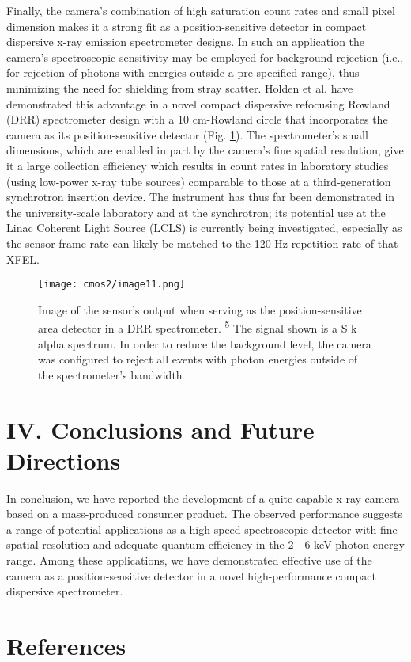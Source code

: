 Finally, the camera's combination of high saturation count rates and
small pixel dimension makes it a strong fit as a position-sensitive
detector in compact dispersive x-ray emission spectrometer designs. In
such an application the camera's spectroscopic sensitivity may be
employed for background rejection (i.e., for rejection of photons with
energies outside a pre-specified range), thus minimizing the need for
shielding from stray scatter. Holden et al. have demonstrated this
advantage in a novel compact dispersive refocusing Rowland (DRR)
spectrometer design with a 10 cm-Rowland circle that incorporates the
camera as its position-sensitive detector (Fig. \ref{cmos2_image11}). The spectrometer's
small dimensions, which are enabled in part by the camera's fine spatial
resolution, give it a large collection efficiency which results in count
rates in laboratory studies (using low-power x-ray tube sources)
comparable to those at a third-generation synchrotron insertion device.
The instrument has thus far been demonstrated in the university-scale
laboratory and at the synchrotron; its potential use at the Linac
Coherent Light Source (LCLS) is currently being investigated, especially
as the sensor frame rate can likely be matched to the 120 Hz repetition
rate of that XFEL.

\begin{figure}[h] \label{cmos2_image11}
\caption{
 Image of the sensor's output when serving as the
position-sensitive area detector in a DRR spectrometer.
\textsuperscript{5} The signal shown is a S k alpha spectrum. In order
to reduce the background level, the camera was configured to reject all
events with photon energies outside of the spectrometer's bandwidth
}
\centering
\texttt{[image: cmos2/image11.png]}
\end{figure}

\FloatBarrier

\section{IV. Conclusions and Future Directions}

In conclusion, we have reported the development of a quite capable x-ray
camera based on a mass-produced consumer product. The observed
performance suggests a range of potential applications as a high-speed
spectroscopic detector with fine spatial resolution and adequate quantum
efficiency in the 2 - 6 keV photon energy range. Among these
applications, we have demonstrated effective use of the camera as a
position-sensitive detector in a novel high-performance compact
dispersive spectrometer.


\section{References}

\emph{\\}









